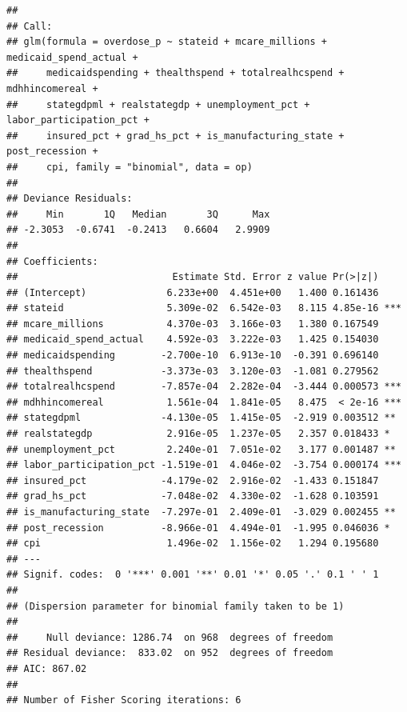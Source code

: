 \documentclass[
]{article}
\newenvironment{Shaded}{\begin{snugshade}}{\end{snugshade}}
\newcommand{\AttributeTok}[1]{\textcolor[rgb]{0.77,0.63,0.00}{#1}}
\newcommand{\FunctionTok}[1]{\textcolor[rgb]{0.00,0.00,0.00}{#1}}
\newcommand{\NormalTok}[1]{#1}
\newcommand{\OtherTok}[1]{\textcolor[rgb]{0.56,0.35,0.01}{#1}}
\newcommand{\SpecialCharTok}[1]{\textcolor[rgb]{0.00,0.00,0.00}{#1}}
\newcommand{\StringTok}[1]{\textcolor[rgb]{0.31,0.60,0.02}{#1}}
\begin{document}
\begin{verbatim}
## 
## Call:
## glm(formula = overdose_p ~ stateid + mcare_millions + medicaid_spend_actual + 
##     medicaidspending + thealthspend + totalrealhcspend + mdhhincomereal + 
##     stategdpml + realstategdp + unemployment_pct + labor_participation_pct + 
##     insured_pct + grad_hs_pct + is_manufacturing_state + post_recession + 
##     cpi, family = "binomial", data = op)
## 
## Deviance Residuals: 
##     Min       1Q   Median       3Q      Max  
## -2.3053  -0.6741  -0.2413   0.6604   2.9909  
## 
## Coefficients:
##                           Estimate Std. Error z value Pr(>|z|)    
## (Intercept)              6.233e+00  4.451e+00   1.400 0.161436    
## stateid                  5.309e-02  6.542e-03   8.115 4.85e-16 ***
## mcare_millions           4.370e-03  3.166e-03   1.380 0.167549    
## medicaid_spend_actual    4.592e-03  3.222e-03   1.425 0.154030    
## medicaidspending        -2.700e-10  6.913e-10  -0.391 0.696140    
## thealthspend            -3.373e-03  3.120e-03  -1.081 0.279562    
## totalrealhcspend        -7.857e-04  2.282e-04  -3.444 0.000573 ***
## mdhhincomereal           1.561e-04  1.841e-05   8.475  < 2e-16 ***
## stategdpml              -4.130e-05  1.415e-05  -2.919 0.003512 ** 
## realstategdp             2.916e-05  1.237e-05   2.357 0.018433 *  
## unemployment_pct         2.240e-01  7.051e-02   3.177 0.001487 ** 
## labor_participation_pct -1.519e-01  4.046e-02  -3.754 0.000174 ***
## insured_pct             -4.179e-02  2.916e-02  -1.433 0.151847    
## grad_hs_pct             -7.048e-02  4.330e-02  -1.628 0.103591    
## is_manufacturing_state  -7.297e-01  2.409e-01  -3.029 0.002455 ** 
## post_recession          -8.966e-01  4.494e-01  -1.995 0.046036 *  
## cpi                      1.496e-02  1.156e-02   1.294 0.195680    
## ---
## Signif. codes:  0 '***' 0.001 '**' 0.01 '*' 0.05 '.' 0.1 ' ' 1
## 
## (Dispersion parameter for binomial family taken to be 1)
## 
##     Null deviance: 1286.74  on 968  degrees of freedom
## Residual deviance:  833.02  on 952  degrees of freedom
## AIC: 867.02
## 
## Number of Fisher Scoring iterations: 6
\end{verbatim}

\begin{Shaded}
\end{Shaded}
\end{document}
